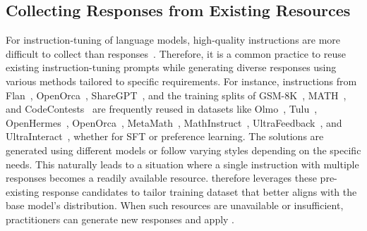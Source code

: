 \subsection{Collecting Responses from Existing Resources}
\label{sec:method_response_collection}
For instruction-tuning of language models, high-quality instructions are more difficult to collect than responses~\cite{xu2024magpie,liu2024best}. 
Therefore, it is a common practice to reuse existing instruction-tuning prompts while generating diverse responses using various methods tailored to specific requirements. For instance, instructions from Flan~\cite{longpre2023flan}, OpenOrca~\cite{OpenOrca}, ShareGPT~\cite{vicuna2023}, and the training splits of GSM-8K~\cite{cobbe2021trainingverifierssolvemath}, MATH~\cite{hendrycks2021measuringmathematicalproblemsolving}, and CodeContests~\cite{alphacode} are frequently reused in datasets like Olmo~\cite{olmo2025}, Tulu~\cite{lambert2024tulu3}, OpenHermes~\cite{OpenHermes}, OpenOrca~\cite{OpenOrca}, MetaMath~\cite{yu2024metamath}, MathInstruct~\cite{yue2023mammoth}, UltraFeedback~\cite{cui2024ultrafeedback}, and UltraInteract~\cite{yuan2024eurus}, whether for SFT or preference learning. The solutions are generated using different models or follow varying styles depending on the specific needs. 
This naturally leads to a situation where a single instruction with multiple responses becomes a readily available resource. \name therefore leverages these pre-existing response candidates to tailor training dataset that better aligns with the base model's distribution. 
When such resources are unavailable or insufficient, practitioners can generate new responses and apply \name.

